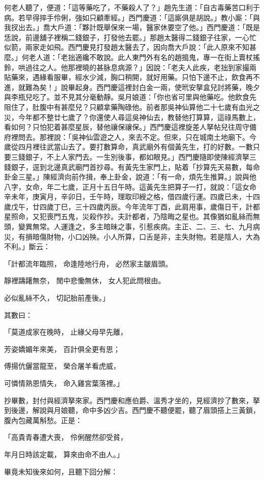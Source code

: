 何老人聽了，便道：「這等藥吃了，不藥殺人了？」趙先生道：「自古毒藥苦口利于病。若早得摔手伶俐，強如只顧牽經。」西門慶道：「這廝俱是胡說。」教小廝：「與我扠出去。」喬大戶道：「夥計既舉保來一場，醫家休要空了他。」西門慶道：「既是恁說，前邊舖子裡稱二錢銀子，打發他去罷。」那趙太醫得二錢銀子往家，一心忙似箭，兩家走如飛。西門慶見打發趙太醫去了，因向喬大戶說：「此人原來不知甚麼。」何老人道：「老拙適纔不敢說。此人東門外有名的趙搗鬼，專一在街上賣杖搖鈴，哄過往之人。他那裡曉的甚脉息病源？」因說：「老夫人此疾，老拙到家撮兩貼藥來，遇緣看服畢，經水少減，胸口稍開，就好用藥。只怕下邊不止，飲食再不進，就難為矣！」說畢起身。西門慶這裡封白金一兩，使玳安拏盒兒討將藥，晚夕與李瓶兒吃了。並不見其分毫動靜。吳月娘道：「你也省可里與他藥吃。他飲食先阻住了，肚腹中有甚麼兒？只顧拿藥陶碌他。前者那吳神仙算他二十七歲有血光之災，今年都不整廿七歲了？你還使人尋這吳神仙去，教替他打算算，這祿馬數上，看如何？只怕犯着甚麼星辰，替他禳保禳保。」西門慶這裡旋差人拏帖兒往周守備府裡問去。那裡說：「吳神仙雲遊之人，來去不定。但來，只在城南土地廟下。今歲從四月裡往武當山去了。要打數算命，真武廟外有個黃先生，打的好數。一數只要三錢銀子，不上人家門去。一生別後事，都如眼見。」西門慶隨即使陳經濟拏三錢銀子，逕到北邊真武廟門首抄尋。有黃先生家門上，貼着「抄算先天易數，每命卦金三星。」陳經濟向前作揖，奉上卦金，說道：「有一命，煩先生推算。」說與他八字，女命，年二七歲，正月十五日午時。這黃先生把算子一打，就說：「這女命辛未年，庚寅月，辛卯日，壬午時，理取印綬之格，借四歲行運。四歲已未，十四歲戊午，廿四歲丁巳，三十四歲丙辰。今年流年丁酉，此肩用事，歲傷日干，計都星照命，又犯喪門五鬼，災殺作抄。夫計都者，乃陰晦之星也。其像猶如亂絲而無頭，變異無常。人運逢之，多主暗昧之事，引惹疾病。主正、二、三、七、九月病災，有損暗傷財物，小口凶殃。小人所算，口舌是非，主失財物。若是陰人，大為不利。」斷云：

「計都流年臨照，  命逢陸地行舟，  必然家主皺眉頭。

靜裡躊躇無奈，  閒中悲慟無休，  女人犯此問根由。

必似亂絲不久，  切記胎前產後。」

其數曰：

「莫道成家在晚時，  止緣父母早先離，

芳姿嬌媚年來美，  百計俱全更有思；

傅揚伉儷當龍至，  榮合屠羊看虎威，

可憐情熟恩情失，  命入雞宮葉落裡。」

抄畢數，封付與經濟拏來家。西門慶和應伯爵、溫秀才坐的，見經濟抄了數來，拏到後邊，解說與月娘聽，命中多凶少吉。西門慶不聽便罷，聽了眉頭搭上三黃鎖，腹內包藏萬斛愁。正是：

「高貴青春遭大喪，  伶俐醒然卻受貧，

年月日時該定載，  算來由命不由人。」

畢竟未知後來如何，且聽下回分解：


